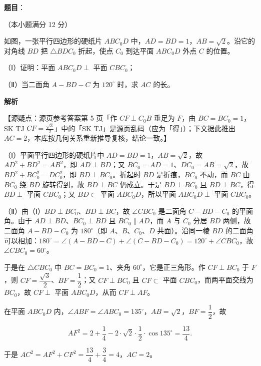 \begin{answer}

\textbf{题目}：

（本小题满分 12 分）

如图，一张平行四边形的硬纸片 $ABC_0D$ 中，$AD=BD=1$，$AB=\sqrt2$。沿它的对角线 $BD$ 把 $\triangle BDC_0$ 折起，使点 $C_0$ 到达平面 $ABC_0D$ 外点 $C$ 的位置。

（Ⅰ）证明：平面 $ABC_0D\perp$ 平面 $CBC_0$；

（Ⅱ）当二面角 $A-BD-C$ 为 $120^\circ$ 时，求 $AC$ 的长。
\nopagebreak[4]
\begin{center}\end{center}
\nopagebreak[4]
\textbf{解析}

【源疑点：源页参考答案第 5 页「作 $CF\perp C_0B$ 垂足为 $F$，由 $BC=BC_0=1$，SK TJ $CF=\frac{\sqrt3}2$」中的「SK TJ」是源页乱码（应为「得」）；下文据此推出 $AC=2$，本库按几何关系重新推导复核，结论一致。】

（Ⅰ）平面平行四边形的硬纸片中 $AD=BD=1$，$AB=\sqrt2$，故 $AD^2+BD^2=AB^2$，即 $AD\perp BD$；又 $BC_0=AD=1$、$DC_0=AB=\sqrt2$，故 $BD^2+BC_0^2=DC_0^2$，即 $BD\perp BC_0$。折起时 $BD$ 是折痕，$BC_0$ 不动，而 $BC$ 由 $BC_0$ 绕 $BD$ 旋转得到，故 $BD\perp BC$ 仍成立。于是 $BD\perp BC_0$ 且 $BD\perp BC$，得 $BD\perp$ 平面 $CBC_0$；又 $BD\subset$ 平面 $ABC_0D$，所以平面 $ABC_0D\perp$ 平面 $CBC_0$。

（Ⅱ）由（Ⅰ）$BD\perp BC_0$、$BD\perp BC$，故 $\angle CBC_0$ 是二面角 $C-BD-C_0$ 的平面角。由于 $AD\perp BD$、$BC_0\perp BD$ 且 $BC_0\parallel AD$，而 $A$ 与 $C_0$ 分居 $BD$ 两侧，故二面角 $A-BD-C_0$ 为 $180^\circ$（即 $A$、$B$、$C_0$、$D$ 共面）。沿同一棱 $BD$ 的二面角可以相加：$180^\circ=\angle(A-BD-C)+\angle(C-BD-C_0)=120^\circ+\angle CBC_0$，故 $\angle CBC_0=60^\circ$。

于是在 $\triangle CBC_0$ 中 $BC=BC_0=1$、夹角 $60^\circ$，它是正三角形。作 $CF\perp BC_0$ 于 $F$，则 $CF=\dfrac{\sqrt3}2$、$BF=\dfrac12$；又 $CF\perp BC_0$ 且 $CF\subset$ 平面 $CBC_0$，而两平面交线为 $BC_0$，故 $CF\perp$ 平面 $ABC_0D$，从而 $CF\perp AF$。

在平面 $ABC_0D$ 内，$\angle ABF=\angle ABC_0=135^\circ$，$AB=\sqrt2$，$BF=\dfrac12$，故

\nopagebreak[4]
\[AF^2=2+\frac14-2\cdot\sqrt2\cdot\frac12\cdot\cos135^\circ=\frac{13}4.\]

于是 $AC^2=AF^2+CF^2=\dfrac{13}4+\dfrac34=4$，$AC=2$。


\end{answer}
